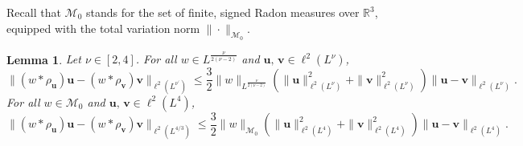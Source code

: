 \documentclass[12pt,a4paper]{amsart}
\newtheorem{lemma}[theorem]{Lemma}
\numberwithin{equation}{section}
\newcommand{\ulu}{\boldsymbol{u}}
\newcommand{\ulv}{\boldsymbol{v}}
\begin{document}
	Recall that $\mathcal{M}_0$ stands for the set of finite, signed Radon measures over $\mathbb{R}^3$, equipped with the total variation norm $\|\cdot\|_{\mathcal{M}_0}$.
	\begin{lemma}\label{lm:Hartree}
		Let $\nu\in[2,4]$. For all $ w \in L^{\frac{\nu}{2(\nu-2)}}$ and $\ulu, \, \ulv \in \ell^2(L^\nu) $, 
		\begin{equation}\label{est:Hartree_Lp_1}
			\| (w \ast \rho_{\ulu}) \ulu - (w \ast \rho_{\ulv}) \ulv \|_{\ell^2(L^{\nu^\prime})} \leq \frac{3}{2} \| w \|_{L^{\frac{\nu}{2(\nu-2)}}} ( \| \ulu  \|_{\ell^2(L^\nu)}^2 +\| \ulv \|_{\ell^2(L^{\nu})}^2  ) \| \ulu-\ulv \|_{\ell^2(L^{\nu})} .
		\end{equation}
		For all $ w \in \mathcal{M}_0$ and $\ulu, \, \ulv \in \ell^2(L^4) $,
		\begin{equation}\label{est:Hartree_Lp_2}
			\| (w \ast \rho_{\ulu}) \ulu - (w \ast \rho_{\ulv}) \ulv \|_{\ell^2(L^{4/3})} \leq \frac{3}{2} \| w \|_{\mathcal{M}_0} ( \| \ulu  \|_{\ell^2(L^4)}^2 +\| \ulv \|_{\ell^2(L^{4})}^2  ) \| \ulu-\ulv \|_{\ell^2(L^{4})} .
		\end{equation}
	\end{lemma}
\end{document}
